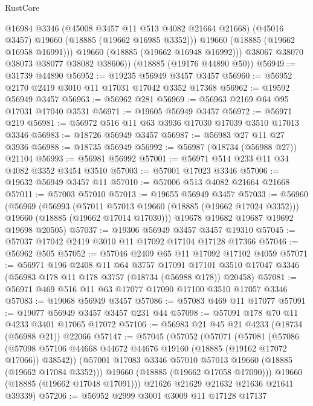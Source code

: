 \begin{lexlean}{RustCore}
\begin{coremodule}
              @16984
              @3346
              (@45008 @3457 @11 @513 @4082 @21664 @21668)
              (@45016 @3457)
              @19660
              (@18885 (@19662 @16985 @3352)))
            @19660
            (@18885 (@19662 @16958 @16991)))
          @19660
          (@18885 (@19662 @16948 @16992)))
        @38067
        @38070
        @38073
        @38077
        @38082
        @38606))
    (@18885 (@19176 @44890 @50))
@56949 := @31739 @44890
@56952 := @19235 @56949 @3457 @3457
@56960 := @56952 @2170 @2419 @3010 @11 @17031 @17042 @3352 @17368
@56962 := @19592 @56949 @3457
@56963 := @56962 @281
@56969 := @56963 @2169 @64 @95 @17031 @17040 @3531
@56971 := @19605 @56949 @3457
@56972 := @56971 @219
@56981 := @56972 @516 @11 @63 @3936 @17030 @17039 @3510 @17013 @3346
@56983 := @18726 @56949 @3457
@56987 := @56983 @27 @11 @27 @3936
@56988 := @18735 @56949
@56992 := @56987 (@18734 (@56988 @27)) @21104
@56993 := @56981 @56992
@57001 := @56971 @514 @233 @11 @34 @4082 @3352 @3454 @3510
@57003 := @57001 @17023 @3346
@57006 := @19632 @56949 @3457 @11
@57010 := @57006 @513 @4082 @21664 @21668
@57011 := @57003 @57010
@57013 := @19655 @56949 @3457
@57033 := @56960
    (@56969
      (@56993
        (@57011 @57013 @19660 (@18885 (@19662 @17024 @3352)))
        @19660
        (@18885 (@19662 @17014 @17030)))
      @19678
      @19682
      @19687
      @19692
      @19698
      @20505)
@57037 := @19306 @56949 @3457 @3457 @19310
@57045 := @57037 @17042 @2419 @3010 @11 @17092 @17104 @17128 @17366
@57046 := @56962 @505
@57052 := @57046 @2409 @65 @11 @17092 @17102 @4059
@57071 := @56971
    @196
    @2408
    @11
    @64
    @3757
    @17091
    @17101
    @3510
    @17047
    @3346
    (@56983 @178 @11 @178 @3757 (@18734 (@56988 @178)) @20458)
@57081 := @56971 @469 @516 @11 @63 @17077 @17090 @17100 @3510 @17057 @3346
@57083 := @19068 @56949 @3457
@57086 := @57083 @469 @11 @17077
@57091 := @19077 @56949 @3457 @3457 @231 @44
@57098 := @57091 @178 @70 @11 @4233 @3401 @17065 @17072
@57106 := @56983 @21 @45 @21 @4233 (@18734 (@56988 @21)) @22066
@57147 := @57045
    (@57052
      (@57071
        (@57081
          (@57086
            (@57098 @57106 @44668 @44672 @44676 @19160 (@18885 (@19162 @17072 @17066)) @38542))
          (@57001 @17083 @3346 @57010 @57013 @19660 (@18885 (@19662 @17084 @3352)))
          @19660
          (@18885 (@19662 @17058 @17090)))
        @19660
        (@18885 (@19662 @17048 @17091)))
      @21626
      @21629
      @21632
      @21636
      @21641
      @39339)
@57206 := @56952
    @2999
    @3001
    @3009
    @11
    @17128
    @17137

\end{coremodule}
\end{lexlean}
